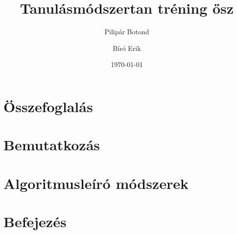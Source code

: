 \documentclass[12pt]{article}
\title{Tanulásmódszertan tréning ősz}
\author{Pilipár Botond}
\author{Bíró Erik}
\date{\today}
\begin{document}


\tableofcontents

\section*{Összefoglalás}


\section{Bemutatkozás}


\section{Algoritmusleíró módszerek}


\section{Befejezés}

\end{document}
